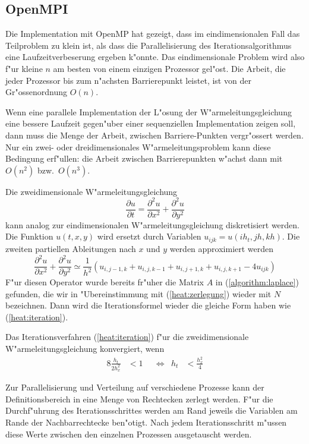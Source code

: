 \subsection{OpenMPI}
Die Implementation mit OpenMP hat gezeigt, dass im eindimensionalen Fall
das Teilproblem zu klein ist, als dass die Parallelisierung des
Iterationsalgorithmus eine Laufzeitverbeserung ergeben k"onnte.
Das eindimensionale Problem wird also f"ur kleine $n$ am besten von einem
einzigen Prozessor gel"ost. 
Die Arbeit, die jeder Prozessor bis zum n"achsten Barrierepunkt
leistet, ist von der Gr"ossenordnung $O(n)$. 

Wenn eine parallele Implementation der L"osung der W"armeleitungsgleichung
eine bessere Laufzeit gegen"uber einer sequenziellen Implementation 
zeigen soll, dann muss die Menge der Arbeit, zwischen Barriere-Punkten
vergr"ossert werden.
Nur ein zwei- oder dreidimensionales W"armeleitungsproblem kann diese
Bedingung erf"ullen:
die Arbeit zwischen Barrierepunkten w"achst dann mit $O(n^2)$ bzw.~$O(n^3)$.

Die zweidimensionale W"armeleitungsgleichung
\[
\frac{\partial u}{\partial t}
=
\frac{\partial^2 u}{\partial x^2}
+
\frac{\partial^2 u}{\partial y^2}
\]
kann analog zur eindimensionalen W"armeleitungsgleichung diskretisiert
werden.
Die Funktion $u(t,x,y)$ wird ersetzt durch Variablen $u_{ijk}=u(ih_t,jh,kh)$.
Die zweiten partiellen Ableitungen nach $x$ und $y$ werden approximiert
werden
\[
\frac{\partial^2u}{\partial x^2}
+
\frac{\partial^2u}{\partial y^2}
\simeq
\frac1{h^2}(
u_{i,j-1,k}
+
u_{i,j,k-1}
+
u_{i,j+1,k}
+
u_{i,j,k+1}
-
4u_{ijk}
)
\]
F"ur diesen Operator wurde bereits fr"uher die Matrix $A$ in
(\ref{algorithm:laplace}) gefunden, die wir in "Ubereinstimmung mit
(\ref{heat:zerlegung}) wieder mit $N$ bezeichnen.
Dann wird die Iterationsformel wieder die gleiche Form haben wie
(\ref{heat:iteration}).

\begin{satz}
Das Iterationsverfahren (\ref{heat:iteration}) f"ur die zweidimensionale
W"armeleitungsgleichung konvergiert, wenn 
\begin{align*}
8\frac{h_t}{2h_x^2}&<1
&&\Leftrightarrow
&
h_t&<\frac{h_x^2}{4}
\end{align*}
\end{satz}

Zur Parallelisierung und Verteilung auf verschiedene Prozesse kann
der Definitionsbereich in eine Menge von Rechtecken zerlegt werden.
F"ur die Durchf"uhrung des Iterationsschrittes werden am Rand jeweils
die Variablen am Rande der Nachbarrechtecke ben"otigt.
Nach jedem Iterationsschritt m"ussen diese Werte zwischen den einzelnen
Prozessen ausgetauscht werden.



